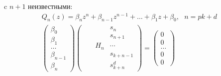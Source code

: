c $n+1$ неизвестными:
\begin{eqnarray}
\label{QH0}
Q_n(z)=\beta_nz^n+\beta_{n-1}z^{n-1}+\ldots+\beta_1z+\beta_0,
\mbox{     } n=pk+d \nonumber
\\ \left(
\begin{array}{cccccccc}
\beta_0 \\ \beta_1 \\ \ldots \\  \beta_{n-1}
\\ \beta_n
\end{array}
\right) \left(
\begin{array}{ccccccccccc}
 &    &         & s_n     \\
 &    &         & s_{n+1} \\
 &    & H_n     & \cdots \\
 &    &         & s_{k+n-1} \\
 &    &         & s_{k+n}^{d}
\end{array}
\right)= \left(
\begin{array}{cccccccc}
0 \\ 0 \\ \ldots \\ 0 \\ 0
\end{array}
\right)
\end{eqnarray}

